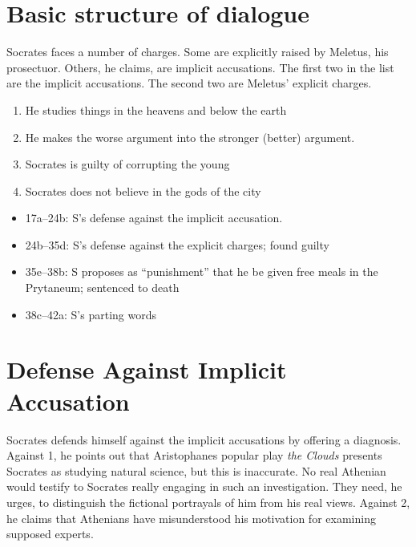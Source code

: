 \documentclass[oneside]{article}
\begin{document}
\thispagestyle{fancy}

\section*{Basic structure of dialogue}

Socrates faces a number of charges. Some are explicitly raised by Meletus, his prosectuor. Others, he claims, are implicit accusations. The first two in the list are the implicit accusations. The second two are Meletus' explicit charges.

\begin{enumerate}
\item He studies things in the heavens and below the earth
\item He makes the worse argument into the stronger (better) argument.
\item Socrates is guilty of corrupting the young
\item Socrates does not believe in the gods of the city
\end{enumerate}


\begin{itemize}
\item 17a--24b: S's defense against the implicit accusation. 
\item 24b--35d: S's defense against the explicit charges; found guilty
\item  35e--38b: S proposes as ``punishment'' that he be given free meals in the Prytaneum; sentenced to death
\item 38c--42a: S's parting words
\end{itemize}

\section*{Defense Against Implicit Accusation}
Socrates defends himself against the implicit  accusations by offering a diagnosis. Against 1, he points out that Aristophanes popular play \emph{the Clouds} presents Socrates as studying natural science, but this is inaccurate. No real Athenian would testify to Socrates really engaging in such an investigation. They need, he urges, to distinguish the fictional portrayals of him from his real views. Against 2, he claims that Athenians have misunderstood his motivation for examining supposed experts. 
\end{document}
